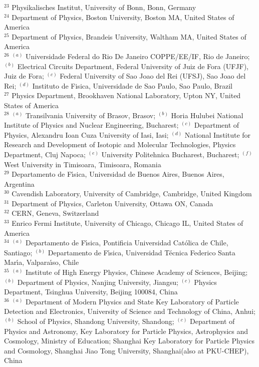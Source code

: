 \begin{flushleft}
$^{23}$ Physikalisches Institut, University of Bonn, Bonn, Germany\\
$^{24}$ Department of Physics, Boston University, Boston MA, United States of America\\
$^{25}$ Department of Physics, Brandeis University, Waltham MA, United States of America\\
$^{26}$ $^{(a)}$ Universidade Federal do Rio De Janeiro COPPE/EE/IF, Rio de Janeiro; $^{(b)}$ Electrical Circuits Department, Federal University of Juiz de Fora (UFJF), Juiz de Fora; $^{(c)}$ Federal University of Sao Joao del Rei (UFSJ), Sao Joao del Rei; $^{(d)}$ Instituto de Fisica, Universidade de Sao Paulo, Sao Paulo, Brazil\\
$^{27}$ Physics Department, Brookhaven National Laboratory, Upton NY, United States of America\\
$^{28}$ $^{(a)}$ Transilvania University of Brasov, Brasov; $^{(b)}$ Horia Hulubei National Institute of Physics and Nuclear Engineering, Bucharest; $^{(c)}$ Department of Physics, Alexandru Ioan Cuza University of Iasi, Iasi; $^{(d)}$ National Institute for Research and Development of Isotopic and Molecular Technologies, Physics Department, Cluj Napoca; $^{(e)}$ University Politehnica Bucharest, Bucharest; $^{(f)}$ West University in Timisoara, Timisoara, Romania\\
$^{29}$ Departamento de F{\'\i}sica, Universidad de Buenos Aires, Buenos Aires, Argentina\\
$^{30}$ Cavendish Laboratory, University of Cambridge, Cambridge, United Kingdom\\
$^{31}$ Department of Physics, Carleton University, Ottawa ON, Canada\\
$^{32}$ CERN, Geneva, Switzerland\\
$^{33}$ Enrico Fermi Institute, University of Chicago, Chicago IL, United States of America\\
$^{34}$ $^{(a)}$ Departamento de F{\'\i}sica, Pontificia Universidad Cat{\'o}lica de Chile, Santiago; $^{(b)}$ Departamento de F{\'\i}sica, Universidad T{\'e}cnica Federico Santa Mar{\'\i}a, Valpara{\'\i}so, Chile\\
$^{35}$ $^{(a)}$ Institute of High Energy Physics, Chinese Academy of Sciences, Beijing; $^{(b)}$ Department of Physics, Nanjing University, Jiangsu; $^{(c)}$ Physics Department, Tsinghua University, Beijing 100084, China\\
$^{36}$ $^{(a)}$ Department of Modern Physics and State Key Laboratory of Particle Detection and Electronics, University of Science and Technology of China, Anhui; $^{(b)}$ School of Physics, Shandong University, Shandong; $^{(c)}$ Department of Physics and Astronomy, Key Laboratory for Particle Physics, Astrophysics and Cosmology, Ministry of Education; Shanghai Key Laboratory for Particle Physics and Cosmology, Shanghai Jiao Tong University, Shanghai(also at PKU-CHEP), China\\

\end{flushleft}

